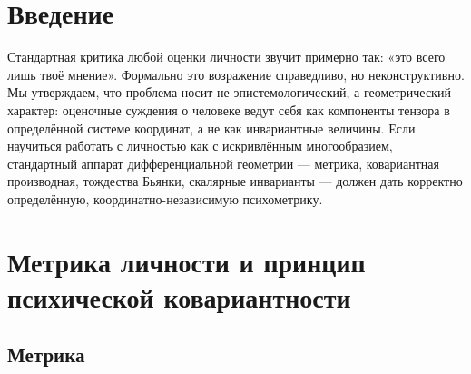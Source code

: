 \documentclass[11pt,a4paper]{article}
\begin{document}
\begin{abstract}
\noindent Здесь мы впервые показываем, что предвзятость оценки личности -- не гносеологическая, а геометрическая проблема, допускающая строгое решение методами общей теории относительности. Существующие подходы к оценке личности — от бытовых суждений («он ленивый») до формализованных опросников — систематически игнорируют базовый факт: любая характеристика человека задаётся в некоторой системе отсчёта наблюдателя и потому по определению координатно-зависима. В настоящей работе мы последовательно переносим аппарат общей теории относительности на психометрику: вводим метрику личности, обсуждаем кривизну и ковариантность оценочных суждений, строим инвариантный скаляр характера по аналогии со скаляром Кречмана, вводим тензор непонимания между наблюдателями и показываем, что усреднение мнений по выборке коррелированных наблюдателей сходится не к истине, а к ненулевой ковариации предрассудка. Обсуждаются ограничения метода.

\medskip
\noindent\textbf{Ключевые слова:} тензорный анализ, ковариантность, психометрика, скаляр Кречмана, предвзятость, лженаука
\end{abstract}

\section{Введение}

Стандартная критика любой оценки личности звучит примерно так: «это всего лишь твоё мнение». Формально это возражение справедливо, но неконструктивно. Мы утверждаем, что проблема носит не эпистемологический, а геометрический характер: оценочные суждения о человеке ведут себя как компоненты тензора в определённой системе координат, а не как инвариантные величины. Если научиться работать с личностью как с искривлённым многообразием, стандартный аппарат дифференциальной геометрии — метрика, ковариантная производная, тождества Бьянки, скалярные инварианты — должен дать корректно определённую, координатно-независимую психометрику.

\section{Метрика личности и принцип психической ковариантности}

\subsection{Метрика}
\end{document}

